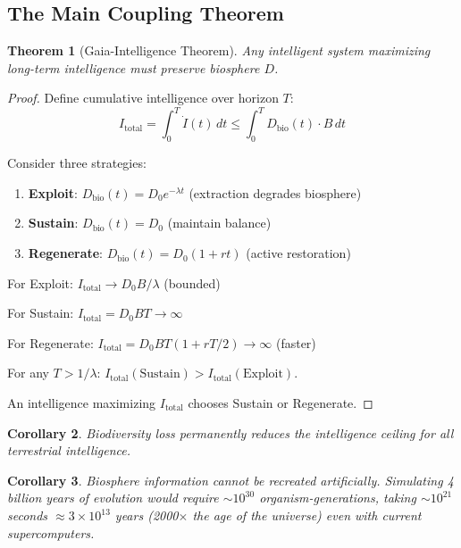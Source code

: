 \documentclass{article}
\newtheorem{theorem}{Theorem}[section]
\newtheorem{corollary}[theorem]{Corollary}
\begin{document}
\subsection{The Main Coupling Theorem}

\begin{theorem}[Gaia-Intelligence Theorem]
\label{thm:gaia}
Any intelligent system maximizing long-term intelligence must preserve biosphere $D$.
\end{theorem}

\begin{proof}
Define cumulative intelligence over horizon $T$:
\begin{equation}
I_{\text{total}} = \int_0^T \dot{I}(t) \, dt \leq \int_0^T D_{\text{bio}}(t) \cdot B \, dt
\end{equation}

Consider three strategies:
\begin{enumerate}
    \item \textbf{Exploit}: $D_{\text{bio}}(t) = D_0 e^{-\lambda t}$ (extraction degrades biosphere)
    \item \textbf{Sustain}: $D_{\text{bio}}(t) = D_0$ (maintain balance)
    \item \textbf{Regenerate}: $D_{\text{bio}}(t) = D_0(1 + rt)$ (active restoration)
\end{enumerate}

For Exploit: $I_{\text{total}} \to D_0 B / \lambda$ (bounded)

For Sustain: $I_{\text{total}} = D_0 B T \to \infty$

For Regenerate: $I_{\text{total}} = D_0 B T (1 + rT/2) \to \infty$ (faster)

For any $T > 1/\lambda$: $I_{\text{total}}(\text{Sustain}) > I_{\text{total}}(\text{Exploit})$.

An intelligence maximizing $I_{\text{total}}$ chooses Sustain or Regenerate.
\end{proof}

\begin{corollary}
Biodiversity loss permanently reduces the intelligence ceiling for all terrestrial intelligence.
\end{corollary}

\begin{corollary}
Biosphere information cannot be recreated artificially. Simulating 4 billion years of evolution would require $\sim 10^{30}$ organism-generations, taking $\sim 10^{21}$ seconds $\approx 3 \times 10^{13}$ years (2000$\times$ the age of the universe) even with current supercomputers.
\end{corollary}
\end{document}
